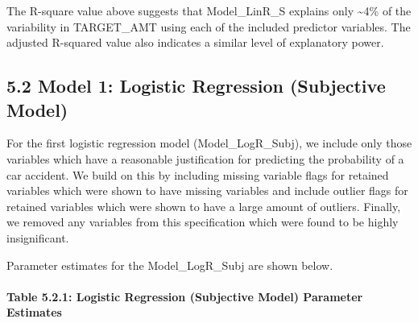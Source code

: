 \documentclass[]{article}
\let\oldparagraph\paragraph
\renewcommand{\paragraph}[1]{\oldparagraph{#1}\mbox{}}
\begin{document}
The R-square value above suggests that Model\_LinR\_S explains only
\textasciitilde{}4\% of the variability in TARGET\_AMT using each of the
included predictor variables. The adjusted R-squared value also
indicates a similar level of explanatory power.

\subsection{5.2 Model 1: Logistic Regression (Subjective
Model)}\label{model-1-logistic-regression-subjective-model}

For the first logistic regression model (Model\_LogR\_Subj), we include
only those variables which have a reasonable justification for
predicting the probability of a car accident. We build on this by
including missing variable flags for retained variables which were shown
to have missing variables and include outlier flags for retained
variables which were shown to have a large amount of outliers. Finally,
we removed any variables from this specification which were found to be
highly insignificant.

Parameter estimates for the Model\_LogR\_Subj are shown below.

\paragraph{Table 5.2.1: Logistic Regression (Subjective Model) Parameter
Estimates}\label{table-5.2.1-logistic-regression-subjective-model-parameter-estimates}
\end{document}
